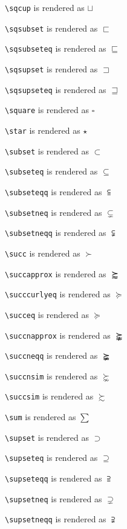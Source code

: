 \texttt{\textbackslash sqcup} is rendered as $\sqcup$

\texttt{\textbackslash sqsubset} is rendered as $\sqsubset$

\texttt{\textbackslash sqsubseteq} is rendered as $\sqsubseteq$

\texttt{\textbackslash sqsupset} is rendered as $\sqsupset$

\texttt{\textbackslash sqsupseteq} is rendered as $\sqsupseteq$

\texttt{\textbackslash square} is rendered as $\square$

\texttt{\textbackslash star} is rendered as $\star$

\texttt{\textbackslash subset} is rendered as $\subset$

\texttt{\textbackslash subseteq} is rendered as $\subseteq$

\texttt{\textbackslash subseteqq} is rendered as $\subseteqq$

\texttt{\textbackslash subsetneq} is rendered as $\subsetneq$

\texttt{\textbackslash subsetneqq} is rendered as $\subsetneqq$

\texttt{\textbackslash succ} is rendered as $\succ$

\texttt{\textbackslash succapprox} is rendered as $\succapprox$

\texttt{\textbackslash succcurlyeq} is rendered as $\succcurlyeq$

\texttt{\textbackslash succeq} is rendered as $\succeq$

\texttt{\textbackslash succnapprox} is rendered as $\succnapprox$

\texttt{\textbackslash succneqq} is rendered as $\succneqq$

\texttt{\textbackslash succnsim} is rendered as $\succnsim$

\texttt{\textbackslash succsim} is rendered as $\succsim$

\texttt{\textbackslash sum} is rendered as $\sum$

\texttt{\textbackslash supset} is rendered as $\supset$

\texttt{\textbackslash supseteq} is rendered as $\supseteq$

\texttt{\textbackslash supseteqq} is rendered as $\supseteqq$

\texttt{\textbackslash supsetneq} is rendered as $\supsetneq$

\texttt{\textbackslash supsetneqq} is rendered as $\supsetneqq$

